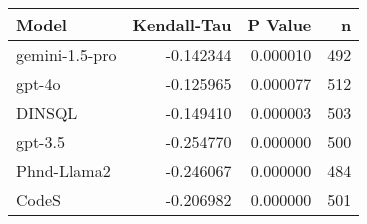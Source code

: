 \begin{tabular}{lrrr}
\toprule
Model & Kendall-Tau & P Value & n \\
\midrule
gemini-1.5-pro & -0.142344 & 0.000010 & 492 \\
gpt-4o & -0.125965 & 0.000077 & 512 \\
DINSQL & -0.149410 & 0.000003 & 503 \\
gpt-3.5 & -0.254770 & 0.000000 & 500 \\
Phnd-Llama2 & -0.246067 & 0.000000 & 484 \\
CodeS & -0.206982 & 0.000000 & 501 \\
\bottomrule
\end{tabular}
